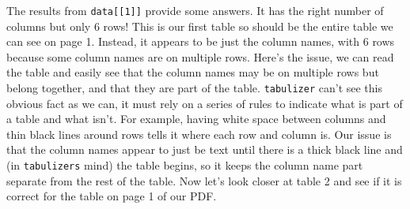 \documentclass[
  12pt,
]{book}
\begin{document}
The results from \texttt{data{[}{[}1{]}{]}} provide some answers. It has the right number of columns but only 6 rows! This is our first table so should be the entire table we can see on page 1. Instead, it appears to be just the column names, with 6 rows because some column names are on multiple rows. Here's the issue, we can read the table and easily see that the column names may be on multiple rows but belong together, and that they are part of the table. \texttt{tabulizer} can't see this obvious fact as we can, it must rely on a series of rules to indicate what is part of a table and what isn't. For example, having white space between columns and thin black lines around rows tells it where each row and column is. Our issue is that the column names appear to just be text until there is a thick black line and (in \texttt{tabulizer\textquotesingle{}s} mind) the table begins, so it keeps the column name part separate from the rest of the table. Now let's look closer at table 2 and see if it is correct for the table on page 1 of our PDF.
\end{document}
